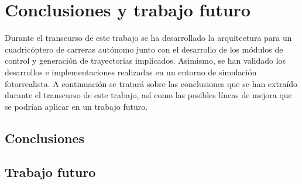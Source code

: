 \chapter{Conclusiones y trabajo futuro}
Durante el transcurso de este trabajo se ha desarrollado la arquitectura para un cuadricóptero de carreras autónomo junto con el desarrollo de los módulos de control y generación de trayectorias implicados. Asimismo, se han validado los desarrollos e implementaciones realizadas en un entorno de simulación fotorrealista. A continuación se tratará sobre las conclusiones que se han extraído durante el transcurso de este trabajo, así como las posibles líneas de mejora que se podrían aplicar en un trabajo futuro.
\section{Conclusiones}

\section{Trabajo futuro}